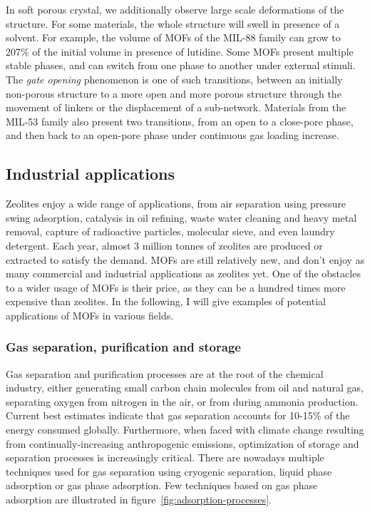 \documentclass[thesis]{subfiles}
\begin{document}
In soft porous crystal, we additionally observe large scale deformations of the
structure. For some materials, the whole structure will swell in presence of a
solvent. For example, the volume of MOFs of the MIL-88 family can grow to 207\%
of the initial volume in presence of lutidine\cite{Serre2007}. Some MOFs present
multiple stable phases, and can switch from one phase to another under external
stimuli. The \emph{gate opening} phenomenon is one of such transitions, between
an initially non-porous structure to a more open and more porous structure
through the movement of linkers or the displacement of a sub-network. Materials
from the MIL-53 family also present two transitions, from an open to a
close-pore phase, and then back to an open-pore phase\cite{Serre2002} under
continuous gas loading increase.

\subsection{Industrial applications}

Zeolites enjoy a wide range of applications, from air separation using pressure
swing adsorption\cite{Rege1997}, catalysis in oil refining\cite{Primo2014},
waste water cleaning and heavy metal removal\cite{Curkovi1997}, capture of
radioactive particles\cite{Borai2009}, molecular sieve\cite{Flanigen1978}, and
even laundry detergent\cite{Karge1989}. Each year, almost 3 million tonnes of
zeolites are produced or extracted to satisfy the demand. MOFs are still
relatively new, and don't enjoy as many commercial and industrial applications
as zeolites yet. One of the obstacles to a wider usage of MOFs is their price,
as they can be a hundred times more expensive than zeolites. In the following, I
will give examples of potential applications of MOFs in various fields.

\subsubsection{Gas separation, purification and storage}

Gas separation and purification processes are at the root of the chemical
industry, either generating small carbon chain molecules from oil and natural
gas, separating oxygen from nitrogen in the air, or  from  during
ammonia production. Current best estimates indicate that gas separation accounts
for 10-15\% of the energy consumed globally\cite{Sholl2016}. Furthermore, when
faced with climate change resulting from continually-increasing anthropogenic
 emissions, optimization of storage and separation processes is
increasingly critical. There are nowadays multiple techniques used for gas
separation using cryogenic separation, liquid phase adsorption or gas phase
adsorption. Few techniques based on gas phase adsorption are illustrated in
figure~\ref{fig:adsorption-processes}.
\end{document}
